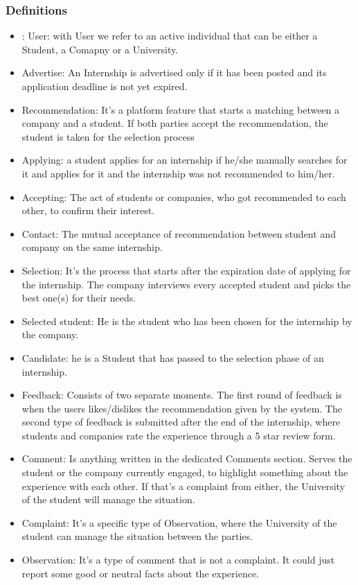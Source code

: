 \documentclass[a4paper,12pt]{article}
\begin{document}
\subsubsection{Definitions}
    \begin{itemize}
        \item: User: with User we refer to an active individual that can be either a Student, a Comapny or a University.
        \item Advertise: An Internship is advertised only if it has been posted and its application deadline is not yet expired.
        \item Recommendation: It's a platform feature that starts a matching between a company and a student. If both parties accept the recommendation, the student is taken for the selection process
        \item Applying: a student applies for an internship if he/she manually searches for it and applies for it and the internship was not recommended to him/her.
        \item Accepting: The act of students or companies, who got recommended to each other, to confirm their interest.
        \item Contact: The mutual acceptance of recommendation between student and company on the same internship.
        \item Selection: It's the process that starts after the expiration date of applying for the internship. The company interviews every accepted student and picks the best one(s) for their needs.
        \item Selected student: He is the student who has been chosen for the internship by the company.
        \item Candidate: he is a Student that has passed to the selection phase of an internship.
        \item Feedback: Consists of two separate moments.
        The first round of feedback is when the users likes/dislikes the recommendation given by the system. The second type of feedback is submitted after the end of the internship, where students and companies rate the experience through a 5 star review form.
        \item Comment: Is anything written in the dedicated Comments section. Serves the student or the company currently engaged, to highlight something about the experience with each other. If that's a complaint from either, the University of the student will manage the situation.
        \item Complaint: It's a specific type of Observation, where the University of the student can manage the situation between the parties.
        \item Observation: It's a type of comment that is not a complaint. It could just report some good or neutral facts about the experience.
    \end{itemize}
\end{document}
